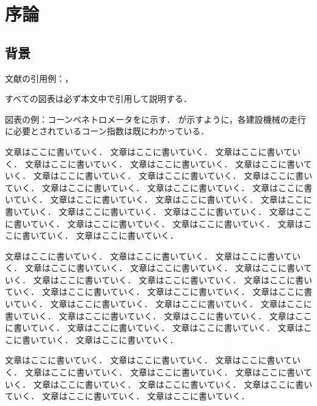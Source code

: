 \documentclass[../main]{subfiles}
\begin{document}
\chapter{序論}
\label{cp:introduction}
\thispagestyle{empty}
\minitoc
\newpage

\section{背景}
\label{sec:intro_background}

文献の引用例：，

すべての図表は必ず本文中で引用して説明する．

図表の例：コーンペネトロメータをに示す．
が示すように，各建設機械の走行に必要とされているコーン指数は既にわかっている．

文章はここに書いていく．
文章はここに書いていく．
文章はここに書いていく．
文章はここに書いていく．
文章はここに書いていく．
文章はここに書いていく．
文章はここに書いていく．
文章はここに書いていく．
文章はここに書いていく．
文章はここに書いていく．
文章はここに書いていく．
文章はここに書いていく．
文章はここに書いていく．
文章はここに書いていく．
文章はここに書いていく．
文章はここに書いていく．
文章はここに書いていく．
文章はここに書いていく．
文章はここに書いていく．
文章はここに書いていく．
文章はここに書いていく．
文章はここに書いていく．

文章はここに書いていく．
文章はここに書いていく．
文章はここに書いていく．
文章はここに書いていく．
文章はここに書いていく．
文章はここに書いていく．
文章はここに書いていく．
文章はここに書いていく．
文章はここに書いていく．
文章はここに書いていく．
文章はここに書いていく．
文章はここに書いていく．
文章はここに書いていく．
文章はここに書いていく．
文章はここに書いていく．
文章はここに書いていく．
文章はここに書いていく．
文章はここに書いていく．
文章はここに書いていく．
文章はここに書いていく．
文章はここに書いていく．
文章はここに書いていく．

文章はここに書いていく．
文章はここに書いていく．
文章はここに書いていく．
文章はここに書いていく．
文章はここに書いていく．
文章はここに書いていく．
文章はここに書いていく．
文章はここに書いていく．
文章はここに書いていく．
文章はここに書いていく．
文章はここに書いていく．
\end{document}
